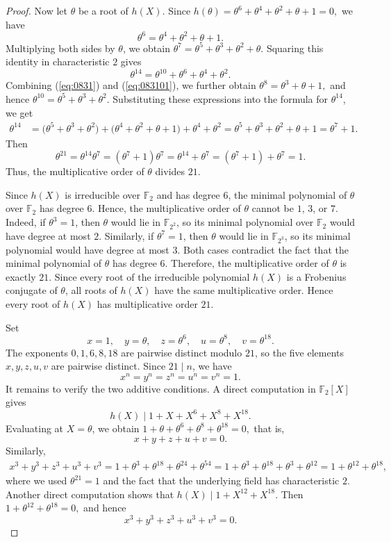 \documentclass[12pt,draftcls,journal,onecolumn]{IEEEtran}
\begin{document}
\begin{proof}
Now let \(\theta\) be a root of \(h(X)\). Since
$
h(\theta)=\theta^6+\theta^4+\theta^2+\theta+1=0,
$
we have
\begin{equation}\label{eq:0831}
\theta^6=\theta^4+\theta^2+\theta+1.
\end{equation}
Multiplying both sides by \(\theta\), we obtain
$
\theta^7=\theta^5+\theta^3+\theta^2+\theta.
$
Squaring this identity in characteristic \(2\) gives
\begin{equation}\label{eq:083101}
\theta^{14}
=
\theta^{10}+\theta^6+\theta^4+\theta^2.
\end{equation}
Combining (\ref{eq:0831}) and (\ref{eq:083101}),
we further obtain
$
\theta^8
=
\theta^3+\theta+1,
$
and hence
$
\theta^{10}
=
\theta^5+\theta^3+\theta^2.
$
Substituting these expressions into the formula for \(\theta^{14}\), we get
$$
\begin{aligned}
\theta^{14}
&=
\bigl(\theta^5+\theta^3+\theta^2\bigr)
+\bigl(\theta^4+\theta^2+\theta+1\bigr)
+\theta^4+\theta^2=
\theta^5+\theta^3+\theta^2+\theta+1=
\theta^7+1.
\end{aligned}
$$
Then
$$
\theta^{21}
=
\theta^{14}\theta^7
=
(\theta^7+1)\theta^7
=
\theta^{14}+\theta^7
=
(\theta^7+1)+\theta^7
=
1.
$$
Thus, the multiplicative order of \(\theta\) divides \(21\).

Since \(h(X)\) is irreducible over \(\mathbb F_2\) and has degree \(6\), the minimal polynomial of \(\theta\) over \(\mathbb F_2\) has degree \(6\). Hence, the multiplicative order of \(\theta\) cannot be \(1\), \(3\), or \(7\). Indeed, if \(\theta^3=1\), then \(\theta\) would lie in \(\mathbb F_{2^2}\), so its minimal polynomial over \(\mathbb F_2\) would have degree at most \(2\). Similarly, if \(\theta^7=1\), then \(\theta\) would lie in \(\mathbb F_{2^3}\), so its minimal polynomial would have degree at most \(3\). Both cases contradict the fact that the minimal polynomial of \(\theta\) has degree \(6\).
Therefore, the multiplicative order of \(\theta\) is exactly
$
21.
$
Since every root of the irreducible polynomial \(h(X)\) is a Frobenius conjugate of \(\theta\), all roots of \(h(X)\) have the same multiplicative order. Hence every root of \(h(X)\) has multiplicative order \(21\).

Set
\[
x=1,\quad
y=\theta,\quad
z=\theta^6,\quad
u=\theta^8,\quad
v=\theta^{18}.
\]
The exponents \(0,1,6,8,18\) are pairwise distinct modulo \(21\), so the five elements \(x,y,z,u,v\) are pairwise distinct. Since \(21\mid n\), we have \[
x^n=y^n=z^n=u^n=v^n=1.
\]
It remains to verify the two additive conditions. A direct computation in \(\mathbb F_2[X]\) gives
\[
h(X)\mid 1+X+X^6+X^8+X^{18}.
\]
Evaluating at \(X=\theta\), we obtain
$
1+\theta+\theta^6+\theta^8+\theta^{18}=0,
$
that is,
\[
x+y+z+u+v=0.
\]
Similarly,
\[
\begin{aligned}
x^3+y^3+z^3+u^3+v^3
=1+\theta^3+\theta^{18}+\theta^{24}+\theta^{54}=1+\theta^3+\theta^{18}+\theta^3+\theta^{12}=1+\theta^{12}+\theta^{18},
\end{aligned}
\]
where we used \(\theta^{21}=1\) and the fact that the underlying field has characteristic \(2\). Another direct computation shows that
$
h(X)\mid 1+X^{12}+X^{18}.
$
Then
$
1+\theta^{12}+\theta^{18}=0,
$
and hence
\[
x^3+y^3+z^3+u^3+v^3=0.
\]


\end{proof}
\end{document}
